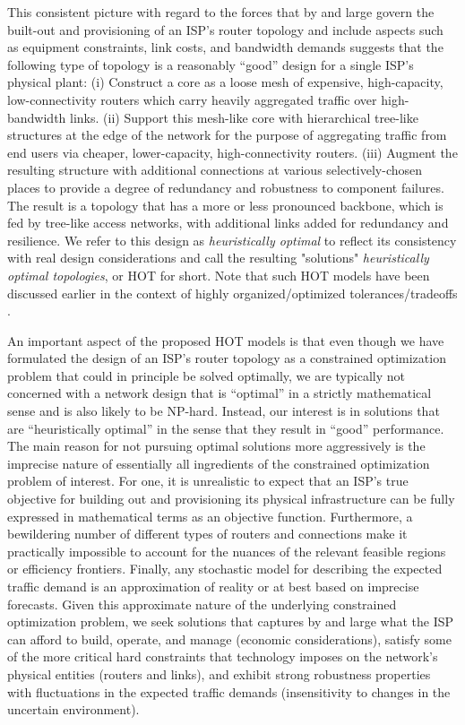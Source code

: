 This consistent picture with regard to the forces that by and large
govern the built-out and provisioning of an ISP's router topology and include aspects 
such as equipment constraints, link costs, and bandwidth demands suggests that the
following type of topology is a reasonably ``good'' design for a single ISP's physical
plant: (i) Construct a core as a loose mesh of expensive, high-capacity, 
low-connectivity routers which carry heavily aggregated traffic over high-bandwidth links.
(ii) Support this mesh-like core with hierarchical tree-like structures at the edge
of the network for the purpose of aggregating traffic from end users via cheaper,
lower-capacity, high-connectivity routers.  (iii) Augment the resulting structure
with additional connections at various selectively-chosen places to provide a degree
of redundancy and robustness to component failures.  The result is a topology that
has a more or less pronounced backbone, which is fed by tree-like access networks, 
with additional links added for redundancy and resilience. We refer to this design
as {\it heuristically optimal} to reflect its consistency with real design considerations
and call the resulting "solutions" {\it heuristically optimal topologies}, or HOT for short.
Note that such HOT models have been discussed earlier in the context of
highly organized/optimized tolerances/tradeoffs \cite{carlson02:_pnas,Fabrikant02}.

An important aspect of the proposed HOT models is that even though we have formulated 
the design of an ISP's router topology as a constrained optimization problem
that could in principle be solved optimally, we are typically not concerned 
with a network design that is ``optimal'' in a strictly mathematical sense and is also 
likely to be NP-hard. Instead, our interest is in solutions that are ``heuristically 
optimal'' in the sense that they result in ``good'' performance. The main reason
for not pursuing optimal solutions more aggressively is the imprecise nature of
essentially all ingredients of the constrained optimization problem of interest.
For one, it is unrealistic to expect that an ISP's true objective for building out
and provisioning its physical infrastructure can be fully expressed in mathematical
terms as an objective function. Furthermore, a bewildering number of different types of
routers and connections make it practically impossible to account for the nuances
of the relevant feasible regions or efficiency frontiers. Finally, any stochastic
model for describing the expected traffic demand is an approximation of reality 
or at best based on imprecise forecasts.  Given this approximate nature of the
underlying constrained optimization problem, we seek solutions that captures by and 
large what the ISP can afford to build, operate, and manage (\ie economic 
considerations), satisfy some of the more critical hard constraints that technology 
imposes on the network's physical entities (\ie routers and links), and exhibit
strong robustness properties with fluctuations in the expected traffic demands
(\ie insensitivity to changes in the uncertain environment).


